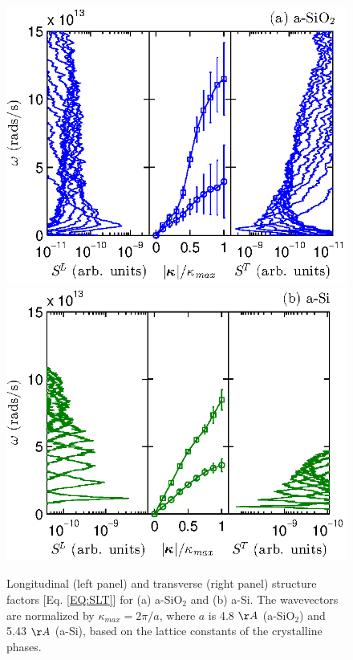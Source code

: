 \documentclass[aps,prb,twocolumn,superscriptaddress,footinbib,amsmath,amssymb,floatfix]{revtex4}
\begin{document}
\begin{figure}
\begin{center}
\includegraphics[scale=1.0]
{fig3b.eps}
\includegraphics[scale=1.0]
{fig3a.eps}
\end{center}
\caption{\label{FIG:disp} Longitudinal (left panel) and transverse 
(right panel) structure factors [Eq. \eqref{EQ:SLT}] for (a) a-SiO$_2$ 
and (b) a-Si. 
The wavevectors are normalized by $\kappa_{max} = 2\pi/a$, where $a$ 
is 4.8 $\AA$ (a-SiO$_2$) and 5.43 $\AA$ (a-Si), based 
on the lattice constants of the crystalline phases.
\cite{stillinger_computer_1985,van_Beest_force_1990} }
\end{figure}
\end{document}
